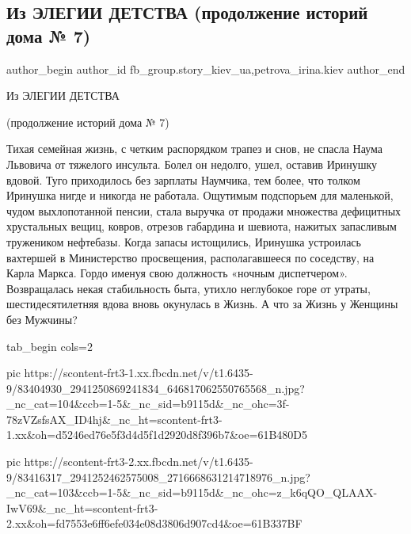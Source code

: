  
 
 
 
 
 
\subsection{Из ЭЛЕГИИ ДЕТСТВА (продолжение историй дома № 7)}
\label{sec:21_01_2020.fb.fb_group.story_kiev_ua.1.elegii_prodolzhenie}
 
\ifcmt
 author_begin
   author_id fb_group.story_kiev_ua,petrova_irina.kiev
 author_end
\fi

Из ЭЛЕГИИ ДЕТСТВА

(продолжение историй дома № 7)

Тихая семейная жизнь, с четким распорядком трапез и снов, не спасла Наума
Львовича от тяжелого инсульта. Болел он недолго, ушел, оставив Иринушку вдовой.
Туго приходилось без зарплаты Наумчика, тем более, что толком Иринушка нигде и
никогда не работала. Ощутимым подспорьем для маленькой, чудом выхлопотанной
пенсии, стала выручка от продажи множества дефицитных хрустальных вещиц,
ковров, отрезов габардина и шевиота, нажитых запасливым тружеником нефтебазы.
Когда запасы истощились, Иринушка устроилась вахтершей в Министерство
просвещения, располагавшееся по соседству, на Карла Маркса. Гордо именуя свою
должность «ночным диспетчером». Возвращалась некая стабильность быта, утихло
неглубокое горе от утраты, шестидесятилетняя вдова вновь окунулась в Жизнь. А
что за Жизнь у Женщины без Мужчины?

\ifcmt
  tab_begin cols=2

     pic https://scontent-frt3-1.xx.fbcdn.net/v/t1.6435-9/83404930_2941250869241834_646817062550765568_n.jpg?_nc_cat=104&ccb=1-5&_nc_sid=b9115d&_nc_ohc=3f-78zVZsfsAX_ID4hj&_nc_ht=scontent-frt3-1.xx&oh=d5246ed76e5f3d4d5f1d2920d8f396b7&oe=61B480D5

     pic https://scontent-frt3-2.xx.fbcdn.net/v/t1.6435-9/83416317_2941252462575008_2716668631214718976_n.jpg?_nc_cat=103&ccb=1-5&_nc_sid=b9115d&_nc_ohc=z_k6qQO_QLAAX-IwV69&_nc_ht=scontent-frt3-2.xx&oh=fd7553e6ff6efe034e08d3806d907cd4&oe=61B337BF

